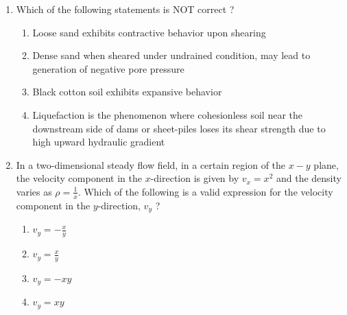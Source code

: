 \documentclass[journal]{IEEEtran}
\begin{document}
\begin{enumerate}
\begin{enumerate}
\end{enumerate}
\item Which of the following statements is NOT correct ?
\begin{enumerate}
    \item Loose sand exhibits contractive behavior upon shearing
    \item Dense sand when sheared under undrained condition, may lead to generation of negative pore pressure
    \item Black cotton soil exhibits expansive behavior
    \item Liquefaction is the phenomenon where cohesionless soil near the downstream side of dams or sheet-piles loses its shear strength due to high upward hydraulic gradient \\
\end{enumerate}
\item In a two-dimensional steady flow field, in a certain region of the $x-y$ plane, the velocity component in the $x$-direction is given by $v_x = x^2$ and the density varies as $\rho = \frac{1}{x}$. Which of the following is a valid expression for the velocity component in the $y$-direction, $v_y$ ?
\begin{enumerate}
    \item $v_y = -\frac{x}{y}$
    \item $v_y = \frac{x}{y}$
    \item $v_y = -xy$
    \item $v_y = xy$ \\
\end{enumerate}
			 \end{enumerate}
			 
\end{document}
